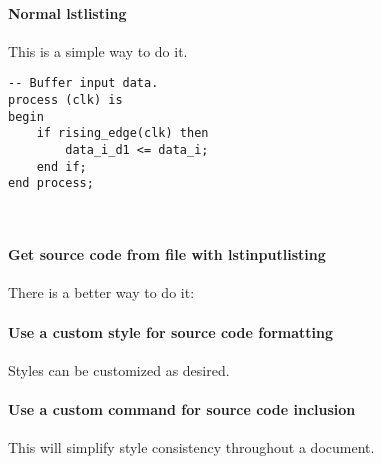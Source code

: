 \documentclass[11pt,a4paper,titlepage,onecolumn]{article}
\newcommand{\includecode}[2][c]{}
\begin{document}
\paragraph{Normal lstlisting}
This is a simple way to do it.
\begin{lstlisting}
-- Buffer input data.
process (clk) is
begin
	if rising_edge(clk) then
		data_i_d1 <= data_i;
	end if;
end process;
\end{lstlisting}~\\

\paragraph{Get source code from file with lstinputlisting}
There is a better way to do it:
~\\

\paragraph{Use a custom style for source code formatting}
Styles can be customized as desired.
~\\

\paragraph{Use a custom command for source code inclusion}
This will simplify style consistency throughout a document.
\includecode{test.c}~\\
\end{document}

